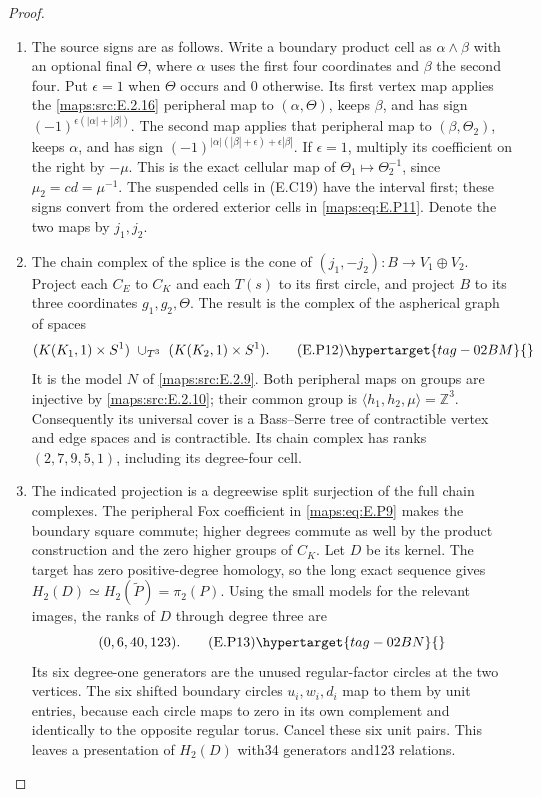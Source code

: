 \begin{proof}
\begin{enumerate}[label={$\langle1\rangle$\arabic*.},leftmargin=*]
\item The source signs are as follows. Write
a boundary product cell as $\alpha\wedge\beta$
with an optional final $\Theta$, where $\alpha$
uses the first four coordinates and $\beta$ the
second four. Put $\epsilon=1$ when $\Theta$ occurs
and $0$ otherwise. Its first vertex map applies
the \ref{maps:src:E.2.16} peripheral map to $(\alpha,\Theta)$,
keeps $\beta$, and has sign
$(-1)^{\epsilon(|\alpha|+|\beta|)}$.
The second map applies that peripheral map to
$(\beta,\Theta_2)$, keeps $\alpha$, and has sign
$(-1)^{|\alpha|(|\beta|+\epsilon)+\epsilon|\beta|}$.
If $\epsilon=1$, multiply its coefficient on the
right by $-\mu$. This is the exact cellular map
of $\Theta_1\mapsto\Theta_2^{-1}$, since
$\mu_2=cd=\mu^{-1}$. The suspended cells in (E.C19)
have the interval first; these signs convert from
the ordered exterior cells in \eqref{maps:eq:E.P11}.
Denote the two maps by $j_1,j_2$.

\item The chain complex of the splice is the cone of
$(j_1,-j_2):B\to V_1\oplus V_2$.
Project each $C_E$ to $C_K$ and each $T(s)$ to its
first circle, and project $B$ to its three coordinates
$g_1,g_2,\Theta$. The result is the complex of the
aspherical graph of spaces
\[
 (K(K_1,1)\times S^1)\ \cup_{T^3}\
                         (K(K_2,1)\times S^1).
 \tag{E.P12}\hypertarget{tag-02BM}{}\label{maps:eq:E.P12}
\]
It is the model $N$ of \ref{maps:src:E.2.9}. Both peripheral maps
on groups are injective by \ref{maps:src:E.2.10}; their common
group is $\langle h_1,h_2,\mu\rangle=\mathbb Z^3$.
Consequently its universal cover is a Bass--Serre
tree of contractible vertex and edge spaces and
is contractible. Its chain complex has ranks
$(2,7,9,5,1)$, including its degree-four cell.

\item The indicated projection is a degreewise split
surjection of the full chain complexes. The
peripheral Fox coefficient in \eqref{maps:eq:E.P9} makes the
boundary square commute; higher degrees commute
as well by the product construction and the
zero higher groups of $C_K$. Let $D$ be its kernel.
The target has zero positive-degree homology, so
the long exact sequence gives
$H_2(D)\simeq H_2(\widetilde P)=\pi_2(P)$.
Using the small models for the relevant images,
the ranks of $D$ through degree three are
\[
                         (0,6,40,123).
 \tag{E.P13}\hypertarget{tag-02BN}{}\label{maps:eq:E.P13}
\]
Its six degree-one generators are the unused
regular-factor circles at the two vertices.
The six shifted boundary circles $u_i,w_i,d_i$
map to them by unit entries, because each circle
maps to zero in its own complement and identically
to the opposite regular torus. Cancel these six
unit pairs. This leaves a presentation of $H_2(D)$
with34 generators and123 relations.


\end{enumerate}
\end{proof}
